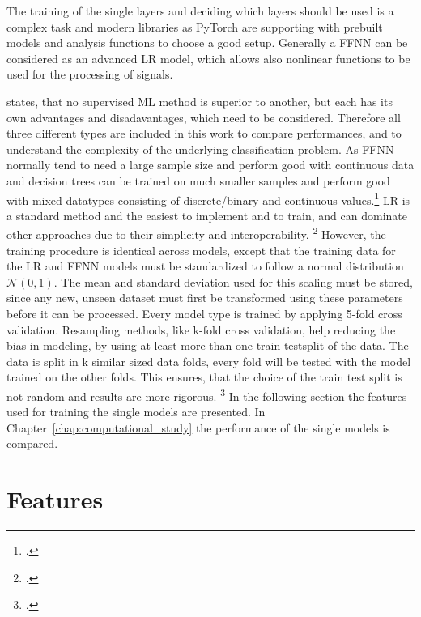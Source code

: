 

The training of the single layers and deciding which layers should be used is a complex task
and modern libraries as PyTorch are supporting with prebuilt models and analysis functions to choose
a good setup. Generally a \gls{FFNN} can be considered as an advanced \gls{LR} model,
which allows also nonlinear functions to be used for the processing of signals.

\parbreak
\cite{kotsiantis_supervised_2007} states, that no supervised \gls{ML} method is superior to another,
but each has its own advantages and disadavantages, which need to be considered.
Therefore all three different types are included in this work to compare performances, and
to understand the complexity of the underlying classification problem. As \gls{FFNN} normally
tend to need a large sample size and perform good with continuous data and  decision trees can be
trained on much smaller samples and perform good with mixed datatypes consisting of discrete/binary
and continuous values.\footcite[cf.][pp. 262ff.]{kotsiantis_supervised_2007}
\gls{LR} is a standard method and the easiest to implement and to train, and can dominate
other approaches due to their simplicity and interoperability. \footcite[cf.][p.8]{kirasich_random_2018}
However, the training procedure is identical across models, except that the training data for the \gls{LR} and \gls{FFNN}
models must be standardized to follow a normal distribution $\mathcal{N}(0,1)$. The mean and standard deviation used
for this scaling must be stored, since any new, unseen dataset must first be transformed
using these parameters before it can be processed. Every model type is trained by applying 5-fold cross validation.
Resampling methods, like k-fold cross validation, help reducing the bias in modeling, by using at least more than one train testsplit of the data.
The data is split in k similar sized data folds, every fold will be tested with the model trained on the other folds.
This ensures, that the choice of the train test split is not random and results are more rigorous. \footcite[cf.][pp.69-72]{kuhn_applied_2016}
In the following section the features used for training
the single models are presented. In Chapter~\ref{chap:computational_study} the performance of the single models is compared.


\section{Features}
\label{sec:Features}

